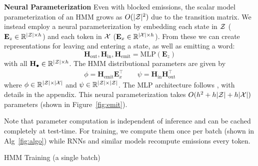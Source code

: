 \documentclass[11pt,a4paper]{article}
\begin{document}
\vspace{0.2cm}

\noindent
\textbf{Neural Parameterization}
Even with blocked emissions, the scalar model parameterization of an HMM grows as $O(|\mathcal{Z}|^2)$
due to the transition matrix.
We instead employ a neural parameterization by
embedding each state in $\mathcal{Z}$ ($\mathbf{E}_z \in \mathbb{R}^{|\mathcal{Z}| \times h}$)
and each token in $\mathcal{X}$ ($\mathbf{E}_x \in \mathbb{R}^{|\mathcal{X}| \times h}$).
From these we can create representations for leaving and entering a state,
as well as emitting a word: 
\[ \mathbf{H}_{\textrm{out}},\mathbf{H}_{\textrm{in}},\mathbf{H}_\textrm{emit}
 = \text{MLP}( \mathbf{E}_z ) \] 
with all $\mathbf{H}_{\bullet} \in \mathbb{R}^{|\mathcal{Z}|\times h}$.
The HMM distributional parameters are given by
\begin{equation}
\begin{aligned}
\phi = \mathbf{H}_\textrm{emit}\mathbf{E}_x ^\top \qquad 
\psi = \mathbf{H}_\textrm{in}\mathbf{H}_\textrm{out}^\top
\end{aligned}
\end{equation}
where $\phi \in \mathbb{R}^{|\mathcal{Z}|\times|\mathcal{X}|}$ and
$\psi \in \mathbb{R}^{|\mathcal{Z}|\times|\mathcal{Z}|}$.
The MLP architecture follows \cite{kim2019cpcfg}, with details in the appendix.
This neural parameterization takes $O(h^2 + h|\mathcal{Z}| + h|\mathcal{X}|)$ parameters
(shown in Figure~\ref{fig:emit}).

Note that parameter computation is independent of inference
and can be cached completely at test-time.
For training, we compute them once per batch (shown in Alg~\ref{fig:algo})
while RNNs and similar models recompute emissions every token.

\begin{algorithm}[t]
\begin{algorithmic}
        \EndFor
    \EndFor
\end{algorithmic}
\caption{
\label{fig:algo}
HMM Training (a single batch)
}
\end{algorithm}

\vspace{0.2cm}
\end{document}
